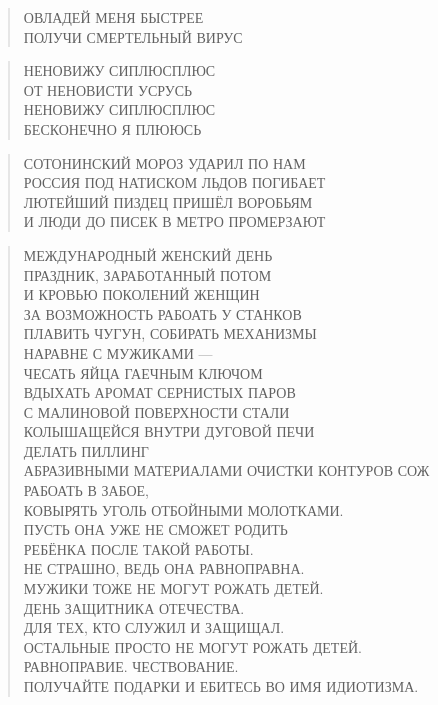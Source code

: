 \poemtitle{***}
\begin{verse}
ОВЛАДЕЙ МЕНЯ БЫСТРЕЕ\\
ПОЛУЧИ СМЕРТЕЛЬНЫЙ ВИРУС
\end{verse}

\poemtitle{***}
\begin{verse}
НЕНОВИЖУ СИПЛЮСПЛЮС\\
ОТ НЕНОВИСТИ УСРУСЬ\\
НЕНОВИЖУ СИПЛЮСПЛЮС\\
БЕСКОНЕЧНО Я ПЛЮЮСЬ
\end{verse}

\poemtitle{***}
\begin{verse}
СОТОНИНСКИЙ МОРОЗ УДАРИЛ ПО НАМ\\
РОССИЯ ПОД НАТИСКОМ ЛЬДОВ ПОГИБАЕТ\\
ЛЮТЕЙШИЙ ПИЗДЕЦ ПРИШЁЛ ВОРОБЬЯМ\\
И ЛЮДИ ДО ПИСЕК В МЕТРО ПРОМЕРЗАЮТ
\end{verse}

\poemtitle{***}
\begin{verse}
МЕЖДУНАРОДНЫЙ ЖЕНСКИЙ ДЕНЬ\\
ПРАЗДНИК, ЗАРАБОТАННЫЙ ПОТОМ\\
И КРОВЬЮ ПОКОЛЕНИЙ ЖЕНЩИН\\
ЗА ВОЗМОЖНОСТЬ РАБОАТЬ У СТАНКОВ\\
ПЛАВИТЬ ЧУГУН, СОБИРАТЬ МЕХАНИЗМЫ\\
НАРАВНЕ С МУЖИКАМИ —\\
ЧЕСАТЬ ЯЙЦА ГАЕЧНЫМ КЛЮЧОМ\\
ВДЫХАТЬ АРОМАТ СЕРНИСТЫХ ПАРОВ \\
С МАЛИНОВОЙ ПОВЕРХНОСТИ СТАЛИ\\
КОЛЫШАЩЕЙСЯ ВНУТРИ ДУГОВОЙ ПЕЧИ\\
ДЕЛАТЬ ПИЛЛИНГ \\
АБРАЗИВНЫМИ МАТЕРИАЛАМИ ОЧИСТКИ КОНТУРОВ СОЖ\\
РАБОАТЬ В ЗАБОЕ, \\
КОВЫРЯТЬ УГОЛЬ ОТБОЙНЫМИ МОЛОТКАМИ.\\
ПУСТЬ ОНА УЖЕ НЕ СМОЖЕТ РОДИТЬ \\
РЕБЁНКА ПОСЛЕ ТАКОЙ РАБОТЫ.\\
НЕ СТРАШНО, ВЕДЬ ОНА РАВНОПРАВНА.\\
МУЖИКИ ТОЖЕ НЕ МОГУТ РОЖАТЬ ДЕТЕЙ.\\
ДЕНЬ ЗАЩИТНИКА ОТЕЧЕСТВА.\\
ДЛЯ ТЕХ, КТО СЛУЖИЛ И ЗАЩИЩАЛ.\\
ОСТАЛЬНЫЕ ПРОСТО НЕ МОГУТ РОЖАТЬ ДЕТЕЙ.\\
РАВНОПРАВИЕ. ЧЕСТВОВАНИЕ.\\
ПОЛУЧАЙТЕ ПОДАРКИ И ЕБИТЕСЬ ВО ИМЯ ИДИОТИЗМА.
\end{verse}


